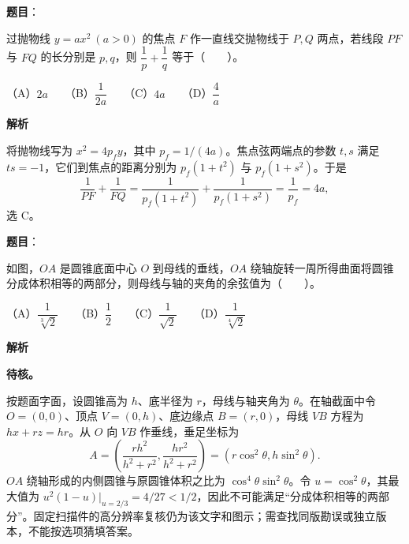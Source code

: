 \begin{answer}

\textbf{题目}：

过抛物线 $y=ax^2\ (a>0)$ 的焦点 $F$ 作一直线交抛物线于 $P,Q$ 两点，若线段 $PF$ 与 $FQ$ 的长分别是 $p,q$，则 $\dfrac{1}{p}+\dfrac{1}{q}$ 等于\mbox{（　　）}。

（A）$2a$　　（B）$\dfrac{1}{2a}$　　（C）$4a$　　（D）$\dfrac{4}{a}$

\textbf{解析}

将抛物线写为 $x^2=4p_fy$，其中 $p_f=1/(4a)$。焦点弦两端点的参数 $t,s$ 满足 $ts=-1$，它们到焦点的距离分别为 $p_f(1+t^2)$ 与 $p_f(1+s^2)$。于是
\nopagebreak[4]
\[
\frac1{PF}+\frac1{FQ}
=\frac1{p_f(1+t^2)}+\frac1{p_f(1+s^2)}
=\frac1{p_f}=4a,
\]
选 C。


\end{answer}
\begin{answer}

\textbf{题目}：

如图，$OA$ 是圆锥底面中心 $O$ 到母线的垂线，$OA$ 绕轴旋转一周所得曲面将圆锥分成体积相等的两部分，则母线与轴的夹角的余弦值为\mbox{（　　）}。
\nopagebreak[4]
\begin{center}\end{center}
\nopagebreak[4]
（A）$\dfrac{1}{\sqrt[3]{2}}$　　（B）$\dfrac{1}{2}$　　（C）$\dfrac{1}{\sqrt{2}}$　　（D）$\dfrac{1}{\sqrt[4]{2}}$

\textbf{解析}

\textbf{待核。}

按题面字面，设圆锥高为 $h$、底半径为 $r$，母线与轴夹角为 $\theta$。在轴截面中令 $O=(0,0)$、顶点 $V=(0,h)$、底边缘点 $B=(r,0)$，母线 $VB$ 方程为 $hx+rz=hr$。从 $O$ 向 $VB$ 作垂线，垂足坐标为
\nopagebreak[4]
\[
A=\left(\frac{rh^2}{h^2+r^2},\frac{hr^2}{h^2+r^2}\right)
=(r\cos^2\theta,h\sin^2\theta).
\]
$OA$ 绕轴形成的内侧圆锥与原圆锥体积之比为 $\cos^4\theta\sin^2\theta$。令 $u=\cos^2\theta$，其最大值为 $u^2(1-u)|_{u=2/3}=4/27<1/2$，因此不可能满足“分成体积相等的两部分”。固定扫描件的高分辨率复核仍为该文字和图示；需查找同版勘误或独立版本，不能按选项猜填答案。


\end{answer}


